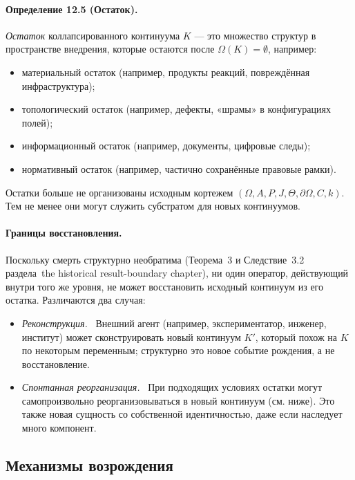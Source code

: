 \paragraph{Определение 12.5 (Остаток).}
\emph{Остаток} коллапсированного континуума \(K\) — это множество
структур в пространстве внедрения, которые остаются после
\(\Omega(K)=\emptyset\), например:
\begin{itemize}
  \item материальный остаток (например, продукты реакций, повреждённая
        инфраструктура);
  \item топологический остаток (например, дефекты, «шрамы» в конфигурациях
        полей);
  \item информационный остаток (например, документы, цифровые следы);
  \item нормативный остаток (например, частично сохранённые правовые рамки).
\end{itemize}

Остатки больше не организованы исходным кортежем
\((\Omega,A,P,J,\Theta,\partial\Omega,C,k)\). Тем не менее они могут
служить субстратом для новых континуумов.

\paragraph{Границы восстановления.}
Поскольку смерть структурно необратима
(Теорема~3 и Следствие~3.2 раздела~the historical result-boundary chapter), ни один оператор,
действующий внутри того же уровня, не может восстановить исходный континуум
из его остатка. Различаются два случая:
\begin{itemize}
  \item \emph{Реконструкция.} \
        Внешний агент (например, экспериментатор, инженер, институт) может
        сконструировать новый континуум \(K'\), который похож на \(K\) по
        некоторым переменным; структурно это новое событие рождения, а не
        восстановление.
  \item \emph{Спонтанная реорганизация.} \
        При подходящих условиях остатки могут самопроизвольно реорганизовываться
        в новый континуум (см. ниже). Это также новая сущность со собственной
        идентичностью, даже если наследует много компонент.
\end{itemize}

\subsection{Механизмы возрождения}

